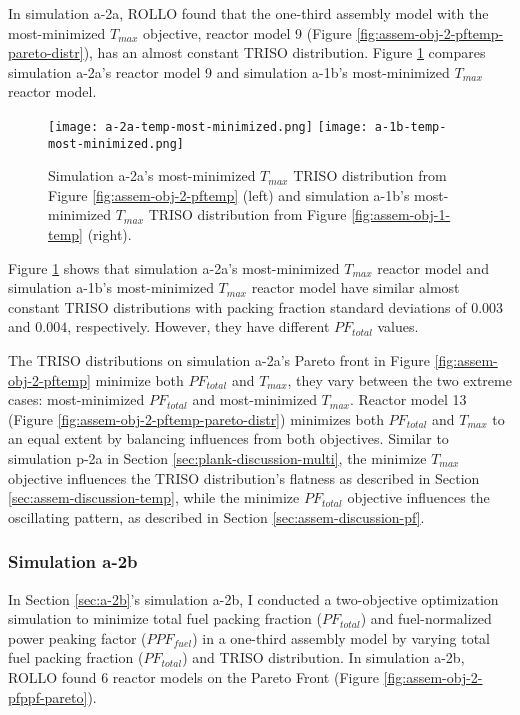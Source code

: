 In simulation a-2a, \gls{ROLLO} found that the one-third assembly model with the 
most-minimized $T_{max}$ objective, reactor model 9 (Figure 
\ref{fig:assem-obj-2-pftemp-pareto-distr}), has an almost constant TRISO distribution.
Figure \ref{fig:a-2a-temp-triso-comparison} compares simulation a-2a's reactor model 9 
and simulation a-1b's most-minimized $T_{max}$ reactor model.  
\begin{figure}[htbp!]
    \centering
    \texttt{[image: a-2a-temp-most-minimized.png]} 
    \texttt{[image: a-1b-temp-most-minimized.png]} 
    \caption{Simulation a-2a's most-minimized $T_{max}$ TRISO distribution 
    from Figure \ref{fig:assem-obj-2-pftemp} (left) and simulation a-1b's 
    most-minimized $T_{max}$ TRISO distribution from Figure 
    \ref{fig:assem-obj-1-temp} (right).}
    \label{fig:a-2a-temp-triso-comparison}
\end{figure}
Figure \ref{fig:a-2a-temp-triso-comparison} shows that simulation a-2a's most-minimized 
$T_{max}$ reactor model and simulation a-1b's most-minimized $T_{max}$ reactor model 
have similar almost constant TRISO distributions with packing fraction standard 
deviations of $0.003$ and $0.004$, respectively.
However, they have different $PF_{total}$ values. 
 
The \gls{TRISO} distributions on simulation a-2a's Pareto front in Figure 
\ref{fig:assem-obj-2-pftemp} minimize both $PF_{total}$ and $T_{max}$, they vary
between the two extreme cases: most-minimized $PF_{total}$ and most-minimized $T_{max}$. 
Reactor model 13 (Figure \ref{fig:assem-obj-2-pftemp-pareto-distr}) minimizes both 
$PF_{total}$ and $T_{max}$ to an equal extent by balancing influences from both 
objectives. 
Similar to simulation p-2a in Section \ref{sec:plank-discussion-multi}, 
the minimize $T_{max}$ objective influences the TRISO distribution's flatness as 
described in Section \ref{sec:assem-discussion-temp}, while 
the minimize $PF_{total}$ objective influences the oscillating pattern, as described 
in Section \ref{sec:assem-discussion-pf}.

\subsubsection{Simulation a-2b}
In Section \ref{sec:a-2b}'s simulation a-2b, I conducted a two-objective 
optimization simulation to minimize total fuel packing fraction ($PF_{total}$) and 
fuel-normalized power peaking factor ($PPF_{fuel}$) in a one-third assembly model 
by varying total fuel packing fraction ($PF_{total}$) and TRISO distribution. 
In simulation a-2b, ROLLO found 6 reactor models on the Pareto Front (Figure 
\ref{fig:assem-obj-2-pfppf-pareto}). 

